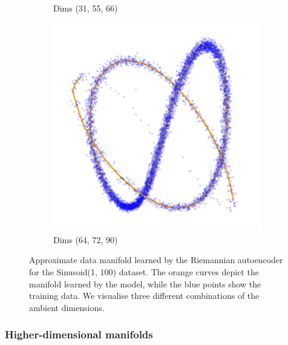 \begin{figure}[htb]
\begin{subfigure}[b]{0.32\textwidth}
            \caption{Dims (31, 55, 66)}
        \end{subfigure}
        \hfill
        \begin{subfigure}[b]{0.32\textwidth}
            \centering
            \includegraphics[width=\textwidth]{chapter5/results/visualisations/RAE/projections/sinusoid_1_100/more_transparent/64_72_90.jpg}
            \caption{Dims (64, 72, 90)}
        \end{subfigure}
    
        \caption{
            Approximate data manifold learned by the Riemannian autoencoder for the Sinusoid(1, 100) dataset. The orange curves depict the manifold learned by the model, while the blue points show the training data. We visualise three different combinations of the ambient dimensions. %
        }
        \label{fig:learned_charts_for_Sinusoid_1_100}
    \end{figure}


\subsubsection{Higher-dimensional manifolds}



